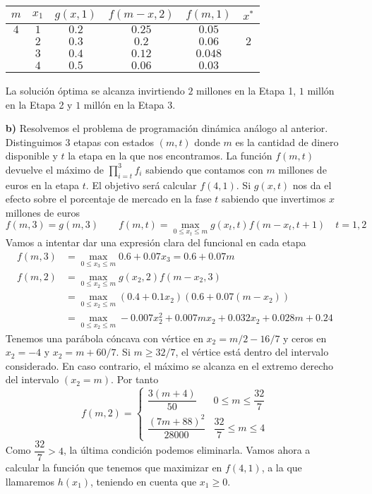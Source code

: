 \documentclass[twoside]{article}
\begin{document}
\begin{solucion}
\begin{itemize}
\begin{center}
\begin{tabular}{|c| c| c| c | c| c|}
\hline
$m$ & $x_1$ & $g(x,1)$ & $f(m-x,2)$ &  $f(m,1)$ & $x^* $ \\
\hline
$4$ & $1$ & $0.2$  & $0.25$  & $0.05$ & \\
\hline            
 & $2$    & $0.3$  &$0.2$ & $0.06$ &$\boxed{2}$\\
\hline            
 & $3$    & $0.4$  &$0.12$ & $0.048$ &\\
\hline
 & $4$ & $0.5$     & $0.06$ & $0.03$&\\
 \hline
\end{tabular}
\end{center}
La solución óptima se alcanza invirtiendo $2$ millones en la Etapa 1, $1$ millón en la Etapa 2 y $1$ millón en la Etapa 3.
\item[\textbf{b)}] Resolvemos el problema de programación dinámica análogo al anterior. Distinguimos $3$ etapas con estados $(m,t)$ donde $m$ es la cantidad de dinero disponible y $t$ la etapa en la que nos encontramos. La función $f(m,t)$ devuelve el máximo de $\prod_{i=t}^3 f_i$ sabiendo que contamos con $m$ millones de euros en la etapa $t$. El objetivo será calcular $f(4,1)$. Si $g(x,t)$ nos da el efecto sobre el porcentaje de mercado en la fase $t$ sabiendo que invertimos $x$ millones de euros	
$$
f(m,3) = g(m,3) \qquad f(m,t)=\max_{0\leq x_t\leq m}g(x_t,t)f(m-x_t,t+1) \quad t=1,2
$$
Vamos a intentar dar una expresión clara del funcional en cada etapa
\begin{align*}
f(m,3)  &= \max_{0\leq x_3\leq m}0.6+0.07x_3 = 0.6+0.07m \\
f(m,2)  &= \max_{0\leq x_2\leq m}g(x_2,2)f(m-x_2,3)\\
		&= \max_{0\leq x_2\leq m}(0.4+0.1x_2)(0.6+0.07(m-x_2))\\
		&= \max_{0\leq x_2\leq m} - 0.007 x_2^2+ 0.007 m x_2 + 0.032 x_2 + 0.028 m   + 0.24
\end{align*}
Tenemos una parábola cóncava con vértice en $x_2=m/2 -16/7$ y ceros en $x_2=-4$ y $x_2=m+60/7$. Si $m\geq 32/7$, el vértice está dentro del intervalo considerado. En caso contrario, el máximo se alcanza en el extremo derecho del intervalo $(x_2=m)$. Por tanto
$$
f(m,2) = 
\begin{cases}
\dfrac{3(m+4)}{50} & 0\leq m \leq \dfrac{32}{7}\\
\dfrac{(7m+88)^2}{28000}& \dfrac{32}{7} \leq m\leq 4
\end{cases}
$$
Como $ \dfrac{32}{7} > 4$, la última condición podemos eliminarla. Vamos ahora a calcular la función que tenemos que maximizar en $f(4,1)$, a la que llamaremos $h(x_1)$, teniendo en cuenta que $x_1\geq 0$.

\end{itemize}
\end{solucion}
\end{document}
